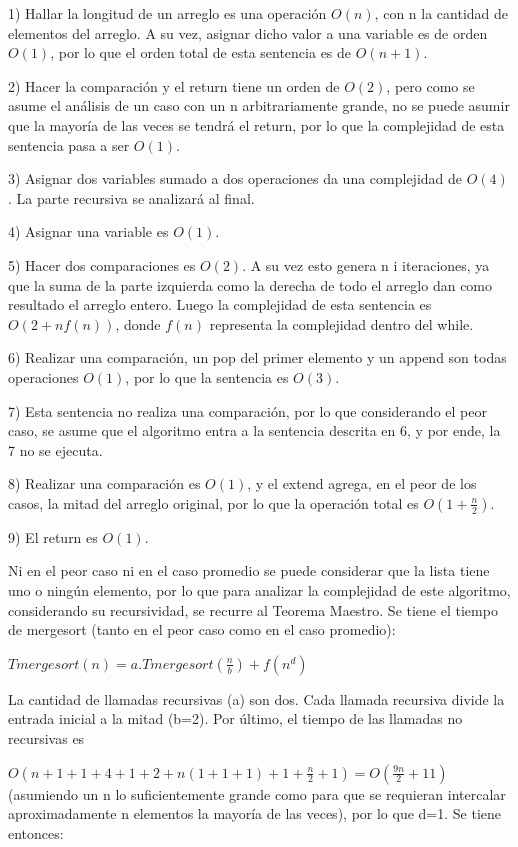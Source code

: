 \documentclass[titlepage,a4paper]{article}
\begin{document}
1)  Hallar la longitud de un arreglo es una operación $O(n)$, con n la cantidad de elementos del arreglo. A su vez, asignar dicho valor a una variable es de orden $O(1)$, por lo que el orden total de esta sentencia es de $O(n + 1)$.

2) Hacer la comparación y el return tiene un orden de $O(2)$, pero como se asume el análisis de un caso con un n arbitrariamente grande, no se puede asumir que la mayoría de las veces se tendrá el return, por lo que la complejidad de esta sentencia pasa a ser $O(1)$.

3) Asignar dos variables sumado a dos operaciones da una complejidad de $O(4)$. La parte recursiva se analizará al final.

4) Asignar una variable es $O(1)$.

5) Hacer dos comparaciones es $O(2)$. A su vez esto genera n i iteraciones, ya que la suma de la parte izquierda como la derecha de todo el arreglo dan como resultado el arreglo entero. Luego la complejidad de esta sentencia es $O(2 + nf(n))$, donde $f(n)$ representa la complejidad dentro del while.

6) Realizar una comparación, un pop del primer elemento y un append son todas operaciones $O(1)$, por lo que la sentencia es $O(3)$. 

7) Esta sentencia no realiza una comparación, por lo que considerando el peor caso, se asume que el algoritmo entra a la sentencia descrita en 6, y por ende, la 7 no se ejecuta.

8) Realizar una comparación es $O(1)$, y el extend agrega, en el peor de los casos, la mitad del arreglo original, por lo que la operación total es $O(1 + \frac{n}{2})$.

9) El return es $O(1)$.

Ni en el peor caso ni en el caso promedio se puede considerar que la lista tiene uno o ningún elemento, por lo que para analizar la complejidad de este algoritmo, considerando su recursividad,  se recurre al Teorema Maestro. Se tiene el tiempo de mergesort (tanto en el peor caso como en el caso promedio):

$Tmergesort(n) = a.Tmergesort(\frac{n}{b}) + f(n^d)$

La cantidad de llamadas recursivas (a) son dos. Cada llamada recursiva divide la entrada inicial a la mitad (b=2). Por último, el tiempo de las llamadas no recursivas es 

$O(n +1 + 1 +4 + 1+ 2 +n(1 + 1 +1) + 1 + \frac{n}{2} +1 ) =O( \frac{9n}{2} +11 )$
(asumiendo un n lo suficientemente grande como para que se requieran intercalar aproximadamente n elementos la mayoría de las veces), por lo que d=1. Se tiene entonces:
\end{document}
